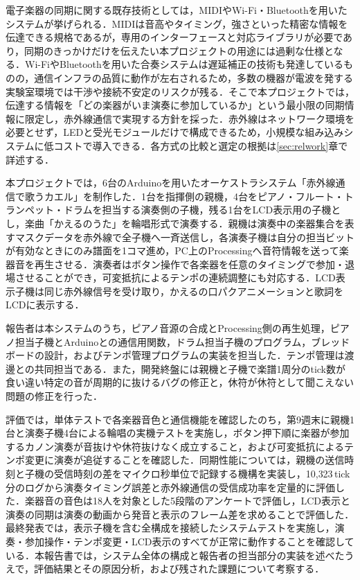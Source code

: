 \documentclass[uplatex,dvipdfmx]{jlreq}
\begin{document}
電子楽器の同期に関する既存技術としては，MIDIやWi-Fi・Bluetoothを用いたシステムが挙げられる．MIDIは音高やタイミング，強さといった精密な情報を伝達できる規格である\cite{midi}が，専用のインターフェースと対応ライブラリが必要であり，同期のきっかけだけを伝えたい本プロジェクトの用途には過剰な仕様となる．Wi-FiやBluetoothを用いた合奏システムは遅延補正の技術も発達しているものの，通信インフラの品質に動作が左右されるため，多数の機器が電波を発する実験室環境では干渉や接続不安定のリスクが残る．そこで本プロジェクトでは，伝達する情報を「どの楽器がいま演奏に参加しているか」という最小限の同期情報に限定し，赤外線通信で実現する方針を採った．赤外線はネットワーク環境を必要とせず，LEDと受光モジュールだけで構成できるため，小規模な組み込みシステムに低コストで導入できる\cite{necfmt}．各方式の比較と選定の根拠は\ref{sec:relwork}章で詳述する．

本プロジェクトでは，6台のArduinoを用いたオーケストラシステム「赤外線通信で歌うカエル」を制作した．1台を指揮側の親機，4台をピアノ・フルート・トランペット・ドラムを担当する演奏側の子機，残る1台をLCD表示用の子機とし，楽曲「かえるのうた」を輪唱形式で演奏する．親機は演奏中の楽器集合を表すマスクデータを赤外線で全子機へ一斉送信し，各演奏子機は自分の担当ビットが有効なときにのみ譜面を1コマ進め，PC上のProcessingへ音符情報を送って楽器音を再生させる．演奏者はボタン操作で各楽器を任意のタイミングで参加・退場させることができ，可変抵抗によるテンポの連続調整にも対応する．LCD表示子機は同じ赤外線信号を受け取り，かえるの口パクアニメーションと歌詞をLCDに表示する．

報告者は本システムのうち，ピアノ音源の合成とProcessing側の再生処理，ピアノ担当子機とArduinoとの通信用関数，ドラム担当子機のプログラム，ブレッドボードの設計，およびテンポ管理プログラムの実装を担当した．テンポ管理は渡邊との共同担当である．また，開発終盤には親機と子機で楽譜1周分のtick数が食い違い特定の音が周期的に抜けるバグの修正と，休符が休符として聞こえない問題の修正を行った．

評価では，単体テストで各楽器音色と通信機能を確認したのち，第9週末に親機1台と演奏子機4台による輪唱の実機テストを実施し，ボタン押下順に楽器が参加するカノン演奏が音抜けや休符抜けなく成立すること，および可変抵抗によるテンポ変更に演奏が追従することを確認した．同期性能については，親機の送信時刻と子機の受信時刻の差をマイクロ秒単位で記録する機構を実装し，10{,}323\,tick分のログから演奏タイミング誤差と赤外線通信の受信成功率を定量的に評価した．楽器音の音色は18人を対象とした5段階のアンケートで評価し，LCD表示と演奏の同期は演奏の動画から発音と表示のフレーム差を求めることで評価した．最終発表では，表示子機を含む全構成を接続したシステムテストを実施し，演奏・参加操作・テンポ変更・LCD表示のすべてが正常に動作することを確認している．本報告書では，システム全体の構成と報告者の担当部分の実装を述べたうえで，評価結果とその原因分析，および残された課題について考察する．
\end{document}
